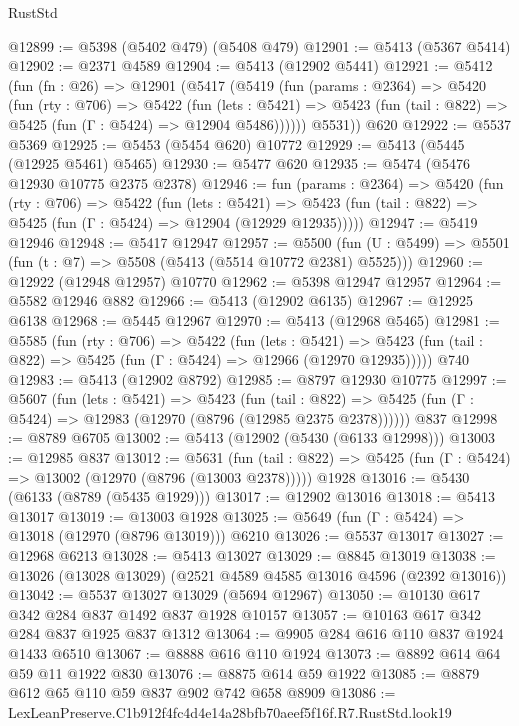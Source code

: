 \begin{lexlean}{RustStd}
\begin{coremodule}
@12899 := @5398 (@5402 @479) (@5408 @479)
@12901 := @5413 (@5367 @5414)
@12902 := @2371 @4589
@12904 := @5413 (@12902 @5441)
@12921 := @5412
    (fun (fn : @26) =>
    @12901
      (@5417
        (@5419
          (fun (params : @2364) =>
          @5420
            (fun (rty : @706) =>
            @5422
              (fun (lets : @5421) =>
              @5423 (fun (tail : @822) => @5425 (fun (Γ : @5424) => @12904 @5486))))))
        @5531))
    @620
@12922 := @5537 @5369
@12925 := @5453 (@5454 @620) @10772
@12929 := @5413 (@5445 (@12925 @5461) @5465)
@12930 := @5477 @620
@12935 := @5474 (@5476 @12930 @10775 @2375 @2378)
@12946 := fun (params : @2364) =>
  @5420
    (fun (rty : @706) =>
    @5422
      (fun (lets : @5421) =>
      @5423 (fun (tail : @822) => @5425 (fun (Γ : @5424) => @12904 (@12929 @12935)))))
@12947 := @5419 @12946
@12948 := @5417 @12947
@12957 := @5500
    (fun (U : @5499) => @5501 (fun (t : @7) => @5508 (@5413 (@5514 @10772 @2381) @5525)))
@12960 := @12922 (@12948 @12957) @10770
@12962 := @5398 @12947 @12957
@12964 := @5582 @12946 @882
@12966 := @5413 (@12902 @6135)
@12967 := @12925 @6138
@12968 := @5445 @12967
@12970 := @5413 (@12968 @5465)
@12981 := @5585
    (fun (rty : @706) =>
    @5422
      (fun (lets : @5421) =>
      @5423 (fun (tail : @822) => @5425 (fun (Γ : @5424) => @12966 (@12970 @12935)))))
    @740
@12983 := @5413 (@12902 @8792)
@12985 := @8797 @12930 @10775
@12997 := @5607
    (fun (lets : @5421) =>
    @5423
      (fun (tail : @822) =>
      @5425 (fun (Γ : @5424) => @12983 (@12970 (@8796 (@12985 @2375 @2378))))))
    @837
@12998 := @8789 @6705
@13002 := @5413 (@12902 (@5430 (@6133 @12998)))
@13003 := @12985 @837
@13012 := @5631
    (fun (tail : @822) => @5425 (fun (Γ : @5424) => @13002 (@12970 (@8796 (@13003 @2378)))))
    @1928
@13016 := @5430 (@6133 (@8789 (@5435 @1929)))
@13017 := @12902 @13016
@13018 := @5413 @13017
@13019 := @13003 @1928
@13025 := @5649 (fun (Γ : @5424) => @13018 (@12970 (@8796 @13019))) @6210
@13026 := @5537 @13017
@13027 := @12968 @6213
@13028 := @5413 @13027
@13029 := @8845 @13019
@13038 := @13026 (@13028 @13029) (@2521 @4589 @4585 @13016 @4596 (@2392 @13016))
@13042 := @5537 @13027 @13029 (@5694 @12967)
@13050 := @10130 @617 @342 @284 @837 @1492 @837 @1928 @10157
@13057 := @10163 @617 @342 @284 @837 @1925 @837 @1312
@13064 := @9905 @284 @616 @110 @837 @1924 @1433 @6510
@13067 := @8888 @616 @110 @1924
@13073 := @8892 @614 @64 @59 @11 @1922 @830
@13076 := @8875 @614 @59 @1922
@13085 := @8879 @612 @65 @110 @59 @837 @902 @742 @658 @8909
@13086 := LexLeanPreserve.C1b912f4fc4d4e14a28bfb70aeef5f16f.R7.RustStd.look19

\end{coremodule}
\end{lexlean}
